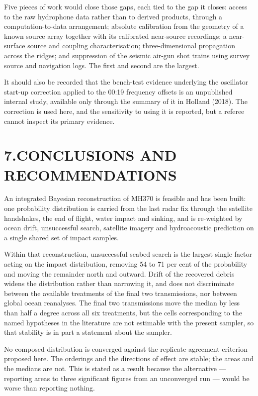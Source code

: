 \documentclass[12pt,a4paper]{article}
\begin{document}
Five pieces of work would close those gaps, each tied to the gap it closes: access to the raw
hydrophone data rather than to derived products, through a computation-to-data arrangement;
absolute calibration from the geometry of a known source array together with its calibrated
near-source recordings; a near-surface source and coupling characterisation; three-dimensional
propagation across the ridges; and suppression of the seismic air-gun shot trains using survey
source and navigation logs. The first and second are the largest.

It should also be recorded that the bench-test evidence underlying the oscillator start-up
correction applied to the 00:19 frequency offsets is an unpublished internal study, available
only through the summary of it in Holland (2018). The correction is used here, and the
sensitivity to using it is reported, but a referee cannot inspect its primary evidence.

\section*{7.\quad CONCLUSIONS AND RECOMMENDATIONS}

An integrated Bayesian reconstruction of MH370 is feasible and has been built: one probability
distribution is carried from the last radar fix through the satellite handshakes, the end of
flight, water impact and sinking, and is re-weighted by ocean drift, unsuccessful search,
satellite imagery and hydroacoustic prediction on a single shared set of impact samples.

Within that reconstruction, unsuccessful seabed search is the largest single factor acting on the
impact distribution, removing 54 to 71 per cent of the probability and moving the remainder north
and outward. Drift of the recovered debris widens the distribution rather than narrowing it, and
does not discriminate between the available treatments of the final two transmissions, nor
between global ocean reanalyses. The final two transmissions move the median by less than half a
degree across all six treatments, but the cells corresponding to the named hypotheses in the
literature are not estimable with the present sampler, so that stability is in part a statement
about the sampler.

No composed distribution is converged against the replicate-agreement criterion proposed here.
The orderings and the directions of effect are stable; the areas and the medians are not. This is
stated as a result because the alternative --- reporting areas to three significant figures from
an unconverged run --- would be worse than reporting nothing.
\end{document}
